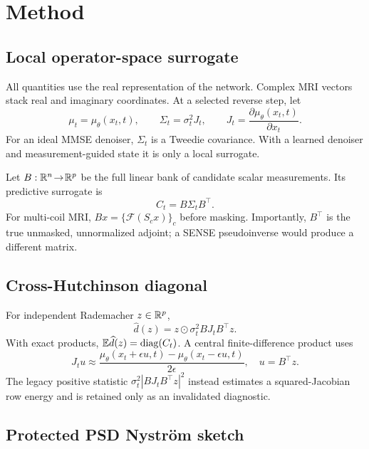 \section{Method}
\label{sec:method}

\subsection{Local operator-space surrogate}

All quantities use the real representation of the network.  Complex MRI
vectors stack real and imaginary coordinates.  At a selected reverse step,
let
\begin{equation}
 \mu_t=\mu_\theta(x_t,t),\qquad
 \Sigma_t=\sigma_t^2J_t,\qquad
 J_t=\frac{\partial\mu_\theta(x_t,t)}{\partial x_t}.
\end{equation}
For an ideal MMSE denoiser, $\Sigma_t$ is a Tweedie covariance.  With a
learned denoiser and measurement-guided state it is only a local surrogate.

Let $B:\mathbb{R}^n\!\rightarrow\!\mathbb{R}^p$ be the full linear bank of candidate scalar
measurements.  Its predictive surrogate is
\begin{equation}
 C_t=B\Sigma_tB^\top.
\end{equation}
For multi-coil MRI, $Bx=\{\mathcal{F}(S_cx)\}_c$ before masking.  Importantly,
$B^\top$ is the true unmasked, unnormalized adjoint; a SENSE pseudoinverse
would produce a different matrix.

\subsection{Cross-Hutchinson diagonal}

For independent Rademacher $z\in\mathbb{R}^p$,
\begin{equation}
 \widehat d(z)=z\odot \sigma_t^2BJ_tB^\top z.
\end{equation}
With exact products, $\mathbb{E}\widehat d(z)=\operatorname{diag}(C_t)$.  A central
finite-difference product uses
\begin{equation}
 J_tu\approx
 \frac{\mu_\theta(x_t+\epsilon u,t)
       -\mu_\theta(x_t-\epsilon u,t)}{2\epsilon},
 \quad u=B^\top z.
\end{equation}
The legacy positive statistic $\sigma_t^2|BJ_tB^\top z|^2$ instead estimates
a squared-Jacobian row energy and is retained only as an invalidated
diagnostic.

\subsection{Protected PSD Nystr\"om sketch}

